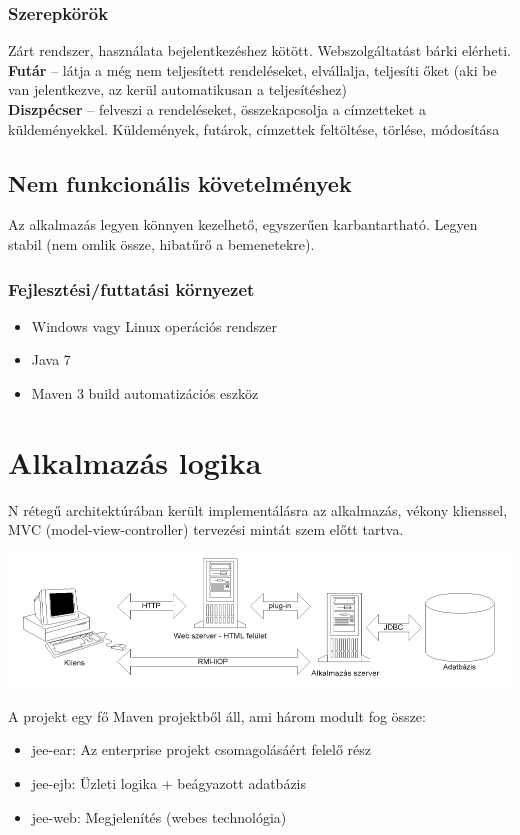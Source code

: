 \documentclass[a4paper,oneside,12pt]{article}
\begin{document}
\subsubsection{Szerepkörök}
Zárt rendszer, használata bejelentkezéshez kötött. Webszolgáltatást bárki elérheti.
\\\textbf{Futár} -- látja a még nem teljesített rendeléseket, elvállalja, teljesíti őket
(aki be van jelentkezve, az kerül automatikusan a teljesítéshez)
\\\textbf{Diszpécser} -- felveszi a rendeléseket, összekapcsolja a címzetteket
a küldeményekkel. Küldemények, futárok, címzettek feltöltése, törlése, módosítása

\subsection{Nem funkcionális követelmények}
Az alkalmazás legyen könnyen kezelhető, egyszerűen karbantartható. Legyen stabil (nem omlik össze, hibatűrő a bemenetekre). 
\subsubsection{Fejlesztési/futtatási környezet}
\begin{itemize}
	\item Windows vagy Linux operációs rendszer 
	\item Java 7
	\item Maven 3 build automatizációs eszköz
\end{itemize}
\section{Alkalmazás logika}
N rétegű architektúrában került implementálásra az alkalmazás, vékony klienssel, MVC (model-view-controller) tervezési
mintát szem előtt tartva.
\begin{center}
        \includegraphics[width=14cm]{n-tier.PNG}
        \label{fig:ntier}
\end{center}
A projekt egy fő Maven projektből áll, ami három modult fog össze:
\begin{itemize}
        \item jee-ear: Az enterprise projekt csomagolásáért felelő rész
        \item jee-ejb: Üzleti logika + beágyazott adatbázis
        \item jee-web: Megjelenítés (webes technológia)
\end{itemize}
\end{document}
